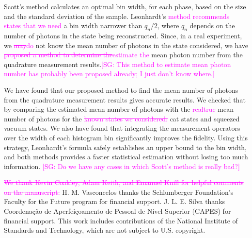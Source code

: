 \documentclass[
reprint,
superscriptaddress,
showpacs,
amsmath,
amssymb,
aps,
pra,
longbibliography
]{revtex4-1}
\providecommand{\aucmnt}[1]{#1}
\providecommand{\editcolor}[2]{\textcolor{#1}{#2}}
\providecommand{\aucmnt}[1]{}
\providecommand{\editcolor}[2]{#2}
\newcommand{\SG}[1]{\editcolor{magenta}{#1}}
\newcommand{\SGs}[1]{\aucmnt{\editcolor{magenta}{\sout{#1}}}}
\newcommand{\SGc}[1]{\aucmnt{\editcolor{magenta}{[SG: #1]}}}
\begin{document}
Scott's method calculates an optimal bin width, for each phase, based
on the size and the standard deviation of the sample. Leonhardt's
\SG{method recommends} \SG{states that we need} a bin width narrower
than $q_n/2$, where $q_n$ depends on the number of photons in the
state being reconstructed. Since, in a real experiment, we
\SGs{may}\SG{do} not know the mean number of photons in the state
considered, we have \SGs{proposed a method to determine
  the}\SG{estimate the} mean photon number from the quadrature
measurement results.\SGc{This method to estimate mean photon number has
  probably been proposed already; I just don't know where.}

We have found that our proposed method to find the mean number of
photons from the quadrature measurement results gives accurate
results. We checked that by comparing the estimated mean number of
photons with the \SGs{real}\SG{true} mean number of photons for the
\SGs{known states we considered:} cat states and squeezed vacuum
states. We also have found that integrating the measurement operators
over the width of each histogram bin significantly improves the
fidelity. Using this strategy, Leonhardt's formula safely establishes
an upper bound to the bin width, and both methods provides a faster
statistical estimation without losing too much information.  \SGc{Do
  we have any cases in which Scott's method is really bad?}



\begin{acknowledgments}
  \SGs{We thank Kevin Coakley, Adam Keith, and Emanuel Knill for
    helpful comments on the manuscript.}  H. M. Vasconcelos thanks the
  Schlumberger Foundation's Faculty for the Future program for
  financial support. J. L. E. Silva thanks Coordena\c c\~ao de
  Aperfei\c coamento de Pessoal de N\'ivel Superior (CAPES) for
  financial support. This work includes contributions of the National
  Institute of Standards and Technology, which are not subject to
  U.S. copyright.
\end{acknowledgments}




%


\end{document}
